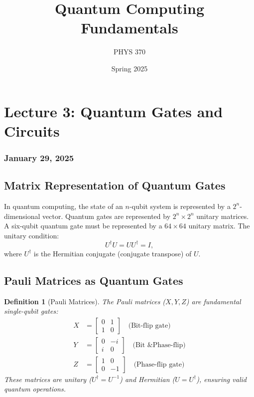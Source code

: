 \documentclass{article}
\title{Quantum Computing Fundamentals}
\author{PHYS 370}
\date{Spring 2025}
\newtheorem{definition}[theorem]{Definition}
\begin{document}
\maketitle

\tableofcontents
\newpage

\section{Lecture 3: Quantum Gates and Circuits}
\subsubsection*{January 29, 2025}

\subsection{Matrix Representation of Quantum Gates}
\begin{conceptbox}
In quantum computing, the state of an \(n\)-qubit system is represented by a \(2^n\)-dimensional vector. Quantum gates are represented by \(2^n \times 2^n\) unitary matrices. A six-qubit quantum gate must be represented by a \(64 \times 64\) unitary matrix. The unitary condition:
\[
U^{\dagger}U = U U^{\dagger} = I,
\]
where \(U^{\dagger}\) is the Hermitian conjugate (conjugate transpose) of \(U\).
\end{conceptbox}

\subsection{Pauli Matrices as Quantum Gates}
\begin{definition}[Pauli Matrices]
The Pauli matrices (\(X, Y, Z\)) are fundamental single-qubit gates:
\begin{align*}
X & = \begin{bmatrix} 0 & 1 \\ 1 & 0 \end{bmatrix} \quad \text{(Bit-flip gate)} \\
Y & = \begin{bmatrix} 0 & -i \\ i & 0 \end{bmatrix} \quad \text{(Bit \& Phase-flip)} \\
Z & = \begin{bmatrix} 1 & 0 \\ 0 & -1 \end{bmatrix} \quad \text{(Phase-flip gate)}
\end{align*}
These matrices are unitary (\(U^{\dagger} = U^{-1}\)) and Hermitian (\(U = U^{\dagger}\)), ensuring valid quantum operations.
\end{definition}
\end{document}
